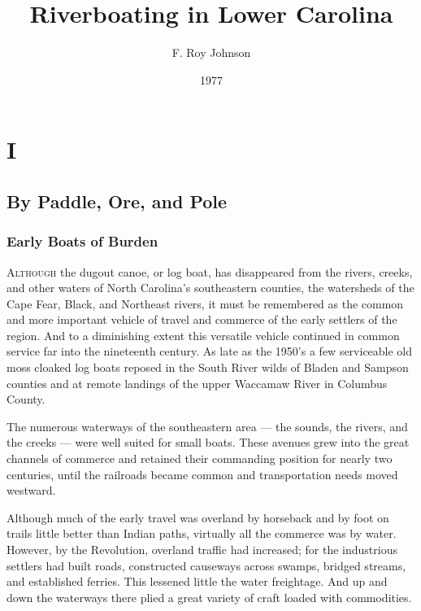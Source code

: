 \documentclass[11pt, a5paper, openright]{book}
\begin{document}
\renewcommand{\thechapter}{\Roman{chapter}}
\title{Riverboating in Lower Carolina}
\author{F. Roy Johnson}
\date{1977}

\maketitle



\part{I}

\chapter{By Paddle, Ore, and Pole}

\section{Early Boats of Burden}

\textsc{Although} the dugout canoe, or log boat, has disappeared from
the rivers, creeks, and other waters of North Carolina's southeastern
counties, the watersheds of the Cape Fear, Black, and Northeast
rivers, it must be remembered as the common and more important vehicle
of travel and commerce of the early settlers of the region.  And to a
diminishing extent this versatile vehicle continued in common service
far into the nineteenth century.  As late as the 1950's a few
serviceable old moss cloaked log boats reposed in the South River
wilds of Bladen and Sampson counties and at remote landings of the
upper Waccamaw River in Columbus County.\par

The numerous waterways of the southeastern area --- the sounds, the
rivers, and the creeks --- were well suited for small boats.  These
avenues grew into the great channels of commerce and retained their
commanding position for nearly two centuries, until the railroads
became common and transportation needs moved westward.\par

Although much of the early travel was overland by horseback and by
foot on trails little better than Indian paths, virtually all the
commerce was by water.  However, by the Revolution, overland traffic
had increased; for the industrious settlers had built roads,
constructed causeways across swamps, bridged streams, and established
ferries.  This lessened little the water freightage.  And up and down
the waterways there plied a great variety of craft loaded with
commodities.\par
\end{document}
